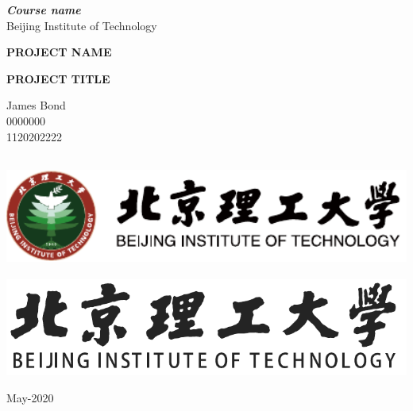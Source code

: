 \documentclass[11pt,english, openany]{book}
\begin{document}

\begin{titlepage}
	\clearpage\thispagestyle{empty}
	\centering
	\vspace{1cm}

	{\normalsize \textbf{\textit{Course name}} \\ 
		Beijing Institute of Technology \par}
		\vspace{5.5cm}
	{\Huge \textbf{PROJECT NAME}} \\
	\vspace{0.6cm}
	{\large \textbf{PROJECT TITLE} \par}
	\vspace{4.3cm}
	{\normalsize James Bond \\ %
	             0000000 \\
	             1120202222\par}
	\vspace{2.6cm}
    
	\centering \includegraphics[height=4cm]{logo_01}\\ %
    \centering \includegraphics[scale=0.4]{logo_slogan.pdf}
    \vspace{0.5cm}

		
	{\normalsize May-2020 \par}
	
	\pagebreak

\end{titlepage}
\end{document}
